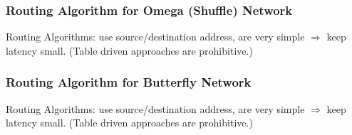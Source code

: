 \documentclass{beamer}
\renewcommand{\emph}[1]{\textcolor{structure}{#1}}
\begin{document}
\begin{frame}[fragile,t]
\frametitle{Routing Algorithm for Omega (Shuffle) Network}

\emph{Routing Algorithms}: use source/destination address, \emph{are very simple} $\Rightarrow$ 
keep latency small. (Table driven approaches are prohibitive.)


\end{frame}

\begin{frame}[fragile,t]
\frametitle{Routing Algorithm for Butterfly Network}

\emph{Routing Algorithms}: use source/destination address, \emph{are very simple} $\Rightarrow$ 
keep latency small. (Table driven approaches are prohibitive.)


\end{frame}
\end{document}
